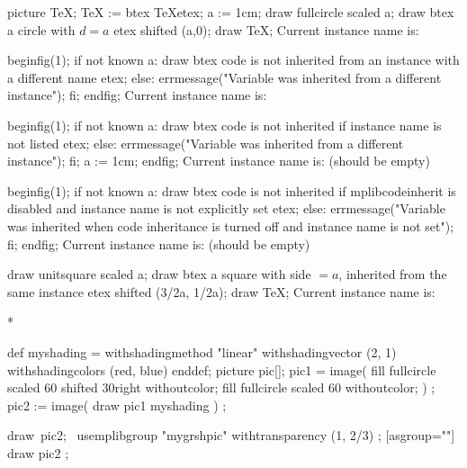 \baselineskip
{}

\mplibcode[instanceOne]
  picture TeX;
  TeX := btex \TeX etex;
a := 1cm;
draw fullcircle scaled a;
draw btex a circle with $d=a$ etex shifted (a,0);
draw TeX;
\endmplibcode
Current instance name is: \currentmpinstancename {}\baselineskip

\mplibcode[instancename=instanceTwo]
beginfig(1);
if not known a:
  draw btex code is not inherited from an instance with a different name etex;
else:
  errmessage("Variable was inherited from a different instance");
fi;
endfig;
\endmplibcode
Current instance name is: \currentmpinstancename {}\baselineskip

\mplibcode
beginfig(1);
if not known a:
  draw btex code is not inherited if instance name is not listed etex;
else:
  errmessage("Variable was inherited from a different instance");
fi;
a := 1cm;
endfig;
\endmplibcode
Current instance name is: \currentmpinstancename (should be empty) \baselineskip

\mplibcode
beginfig(1);
if not known a:
  draw btex code is not inherited if mplibcodeinherit is disabled and instance name is not explicitly set etex;
else:
  errmessage("Variable was inherited when code inheritance is turned off and instance name is not set");
fi;
endfig;
\endmplibcode
Current instance name is: \currentmpinstancename (should be empty) \baselineskip

\mplibcode[instance=instanceOne]
draw unitsquare scaled a;
draw btex a square with side $=a$, inherited from the same instance etex shifted (3/2a, 1/2a);
  draw TeX;
\endmplibcode
Current instance name is: \currentmpinstancename

\medskip
\centerline{*\qquad *\qquad * }
\medskip

\mpfig*
def myshading =
  withshadingmethod "linear"
  withshadingvector (2, 1)
  withshadingcolors (red, blue)
enddef;
picture pic[];
pic1 = image(
fill fullcircle scaled 60 shifted 30right withoutcolor;
fill fullcircle scaled 60 withoutcolor;
) ;
pic2 := image( draw pic1 myshading ) ;
\endmpfig

\hbox{\def\mplibgroupname{mygrshpic}\mpfig draw pic2; \endmpfig}
\leavevmode
\mpfig
usemplibgroup "mygrshpic"
withtransparency (1, 2/3) ;
\endmpfig
{}[asgroup=""]
\mpfig
draw pic2 ;
\endmpfig
\endmplibgroup
{}

